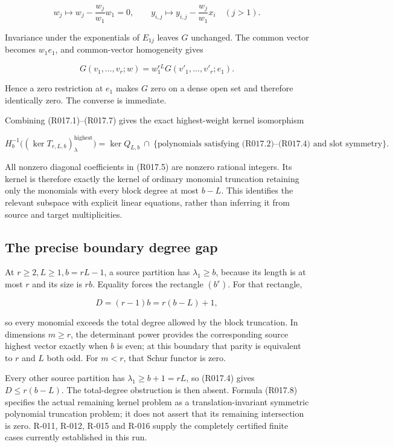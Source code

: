 \documentclass[
  10pt,
]{article}
\begin{document}
\[
 w_j\mapsto w_j-\frac{w_j}{w_1}w_1=0,\qquad
 y_{i,j}\mapsto y_{i,j}-\frac{w_j}{w_1}x_i
 \quad(j>1).
\]

Invariance under the exponentials of \(E_{1j}\) leaves \(G\) unchanged.
The common vector becomes \(w_1e_1\), and common-vector homogeneity
gives

\[
 G(v_1,\ldots,v_r;w)
 =w_1^{rL}
 G(v'_1,\ldots,v'_r;e_1).
 \tag{R017.7}
\]

Hence a zero restriction at \(e_1\) makes \(G\) zero on a dense open set
and therefore identically zero. The converse is immediate.

Combining (R017.1)--(R017.7) gives the exact highest-weight kernel
isomorphism

\[
 \boxed{
 H_b^{-1}\bigl((\ker T_{r,L,b})_\lambda^{\mathrm{highest}}\bigr)
 =
 \ker Q_{L,b}\ \cap\
 \{\text{polynomials satisfying (R017.2)–(R017.4) and slot symmetry}\}.
 }
 \tag{R017.8}
\]

All nonzero diagonal coefficients in (R017.5) are nonzero rational
integers. Its kernel is therefore exactly the kernel of ordinary
monomial truncation retaining only the monomials with every block degree
at most \(b-L\). This identifies the relevant subspace with explicit
linear equations, rather than inferring it from source and target
multiplicities.

\subsection{The precise boundary degree
gap}\label{the-precise-boundary-degree-gap}

At \(r\ge2,L\ge1,b=rL-1\), a source partition has \(\lambda_1\ge b\),
because its length is at most \(r\) and its size is \(rb\). Equality
forces the rectangle \((b^r)\). For that rectangle,

\[
 D=(r-1)b=r(b-L)+1,
\]

so every monomial exceeds the total degree allowed by the block
truncation. In dimensions \(m\ge r\), the determinant power provides the
corresponding source highest vector exactly when \(b\) is even; at this
boundary that parity is equivalent to \(r\) and \(L\) both odd. For
\(m<r\), that Schur functor is zero.

Every other source partition has \(\lambda_1\ge b+1=rL\), so (R017.4)
gives \(D\le r(b-L)\). The total-degree obstruction is then absent.
Formula (R017.8) specifies the actual remaining kernel problem as a
translation-invariant symmetric polynomial truncation problem; it does
not assert that its remaining intersection is zero. R-011, R-012, R-015
and R-016 supply the completely certified finite cases currently
established in this run.
\end{document}

